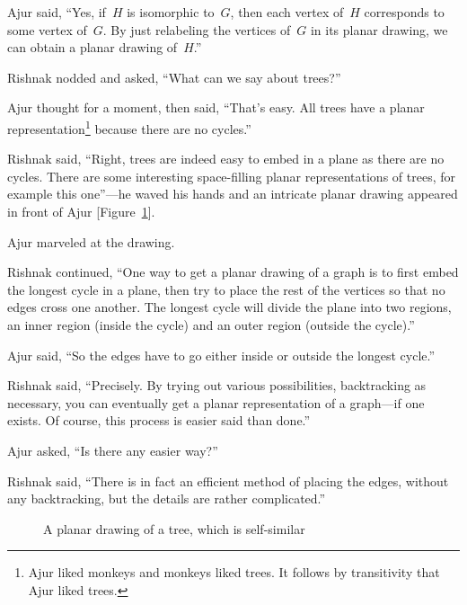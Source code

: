 Ajur said, ``Yes, if~$H$ is isomorphic to~$G$, then each vertex of~$H$ corresponds to some vertex of~$G$. By just relabeling the vertices of~$G$ in its planar drawing, we can obtain a planar drawing of~$H$.''

Rishnak nodded and asked, ``What can we say about trees?''

Ajur thought for a moment, then said, ``That's easy. All trees have a planar representation\footnote{Ajur liked monkeys and monkeys liked trees. It follows by transitivity that Ajur liked trees.} because there are no cycles.''

Rishnak said, ``Right, trees are indeed easy to embed in a plane as there are no cycles. There are some interesting space-filling planar representations of trees, for example this one''---he waved his hands and an intricate planar drawing appeared in front of Ajur [Figure~\ref{9g7}]. 

Ajur marveled at the drawing.

Rishnak continued, ``One way to get a planar drawing of a graph is to first embed the longest cycle in a plane, then try to place the rest of the vertices so that no edges cross one another. The longest cycle will divide the plane into two regions, an inner region (inside the cycle) and an outer region (outside the cycle).''

Ajur said, ``So the edges have to go either inside or outside the longest cycle.''

Rishnak said, ``Precisely. By trying out various possibilities, backtracking as necessary, you can eventually get a planar representation of a graph---if one exists. Of course, this process is easier said than done.''

Ajur asked, ``Is there any easier way?''

Rishnak said, ``There is in fact an efficient method of placing the edges, without any backtracking, but the details are rather complicated.'' %

\begin{figure}
\begin{center}    

  \caption{A planar drawing of a tree, which is self-similar}\label{9g7}
  \end{center}
\end{figure}

